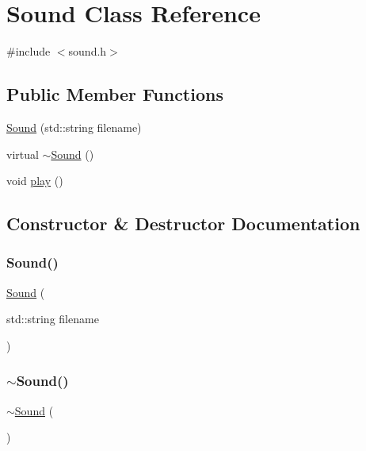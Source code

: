 \hypertarget{classSound}{}\section{Sound Class Reference}
\label{classSound}


{\ttfamily \#include $<$sound.\+h$>$}

\subsection*{Public Member Functions}
\begin{DoxyCompactItemize}
\item 
\mbox{\hyperlink{classSound_abc4f1c2a277d6731194905a54294c7ba}{Sound}} (std\+::string filename)
\item 
virtual \mbox{\hyperlink{classSound_ac34f0a5b7e2e11c053df62714aff04fa}{$\sim$\+Sound}} ()
\item 
void \mbox{\hyperlink{classSound_a6d58098c6cf63c241ed03bc797256bb1}{play}} ()
\end{DoxyCompactItemize}


\subsection{Constructor \& Destructor Documentation}
\mbox{\label{classSound_abc4f1c2a277d6731194905a54294c7ba}} 
\subsubsection{\texorpdfstring{Sound()}{Sound()}}
{\footnotesize\ttfamily \mbox{\hyperlink{classSound}{Sound}} (\begin{DoxyParamCaption}\item[{std\+::string}]{filename }\end{DoxyParamCaption})}

\mbox{\label{classSound_ac34f0a5b7e2e11c053df62714aff04fa}} 
\subsubsection{\texorpdfstring{$\sim$\+Sound()}{~Sound()}}
{\footnotesize\ttfamily $\sim$\mbox{\hyperlink{classSound}{Sound}} (\begin{DoxyParamCaption}{ }\end{DoxyParamCaption})\hspace{0.3cm}{\ttfamily [virtual]}}



